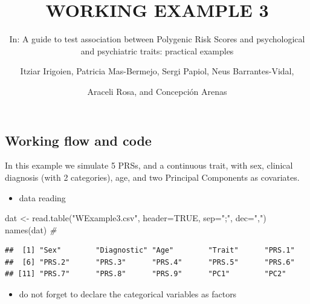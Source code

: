 \documentclass[
]{article}
\title{WORKING EXAMPLE 3}
\subtitle{In: A guide to test association between Polygenic Risk Scores
and psychological and psychiatric traits: practical examples}
\author{Itziar Irigoien, Patricia Mas-Bermejo, Sergi Papiol, Neus
Barrantes-Vidal, \and Araceli Rosa, and Concepción Arenas}
\date{}
\newenvironment{Shaded}{\begin{snugshade}}{\end{snugshade}}
\newcommand{\AttributeTok}[1]{\textcolor[rgb]{0.77,0.63,0.00}{#1}}
\newcommand{\CommentTok}[1]{\textcolor[rgb]{0.56,0.35,0.01}{\textit{#1}}}
\newcommand{\ConstantTok}[1]{\textcolor[rgb]{0.00,0.00,0.00}{#1}}
\newcommand{\FunctionTok}[1]{\textcolor[rgb]{0.00,0.00,0.00}{#1}}
\newcommand{\NormalTok}[1]{#1}
\newcommand{\OtherTok}[1]{\textcolor[rgb]{0.56,0.35,0.01}{#1}}
\newcommand{\SpecialCharTok}[1]{\textcolor[rgb]{0.00,0.00,0.00}{#1}}
\newcommand{\StringTok}[1]{\textcolor[rgb]{0.31,0.60,0.02}{#1}}
\providecommand{\tightlist}{%
  \setlength{\itemsep}{0pt}\setlength{\parskip}{0pt}}
\begin{document}
\maketitle

\hypertarget{working-flow-and-code}{%
\subsection{Working flow and code}\label{working-flow-and-code}}

In this example we simulate 5 PRSs, and a continuous trait, with sex,
clinical diagnosis (with 2 categories), age, and two Principal
Components as covariates.

\begin{itemize}
\tightlist
\item
  data reading
\end{itemize}

\begin{Shaded}
\begin{Highlighting}[]
\NormalTok{dat }\OtherTok{\textless{}{-}} \FunctionTok{read.table}\NormalTok{(}\StringTok{"WExample3.csv"}\NormalTok{, }\AttributeTok{header=}\ConstantTok{TRUE}\NormalTok{, }\AttributeTok{sep=}\StringTok{";"}\NormalTok{, }\AttributeTok{dec=}\StringTok{","}\NormalTok{)}
\FunctionTok{names}\NormalTok{(dat) }\CommentTok{\#}
\end{Highlighting}
\end{Shaded}

\begin{verbatim}
##  [1] "Sex"        "Diagnostic" "Age"        "Trait"      "PRS.1"     
##  [6] "PRS.2"      "PRS.3"      "PRS.4"      "PRS.5"      "PRS.6"     
## [11] "PRS.7"      "PRS.8"      "PRS.9"      "PC1"        "PC2"
\end{verbatim}

\bigskip

\begin{itemize}
\tightlist
\item
  do not forget to declare the categorical variables as factors
\end{itemize}

\begin{Shaded}
\end{Shaded}
\end{document}
